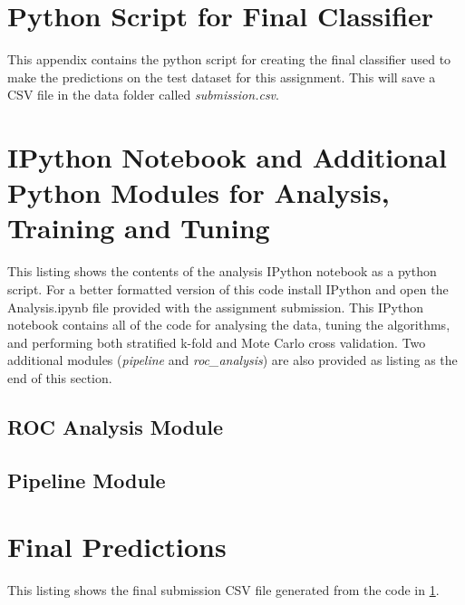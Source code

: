 \documentclass[journal]{IEEEtran}
\begin{document}
\section{Python Script for Final Classifier}
\label{appendix:final-classifier}
This appendix contains the python script for creating the final classifier used to make the predictions on the test dataset for this assignment. This will save a CSV file in the data folder called \textit{submission.csv}.



\section{IPython Notebook and Additional Python Modules for Analysis, Training and Tuning}
This listing shows the contents of the analysis IPython notebook as a python script. For a better formatted version of this code install IPython and open the Analysis.ipynb file provided with the assignment submission. This IPython notebook contains all of the code for analysing the data, tuning the algorithms, and performing both stratified k-fold and Mote Carlo cross validation. Two additional modules (\textit{pipeline} and \textit{roc\_analysis}) are also provided as listing as the end of this section.



\subsection{ROC Analysis Module}


\subsection{Pipeline Module}


\section{Final Predictions}
This listing shows the final submission CSV file generated from the code in \ref{appendix:final-classifier}. 




%
%
\end{document}
